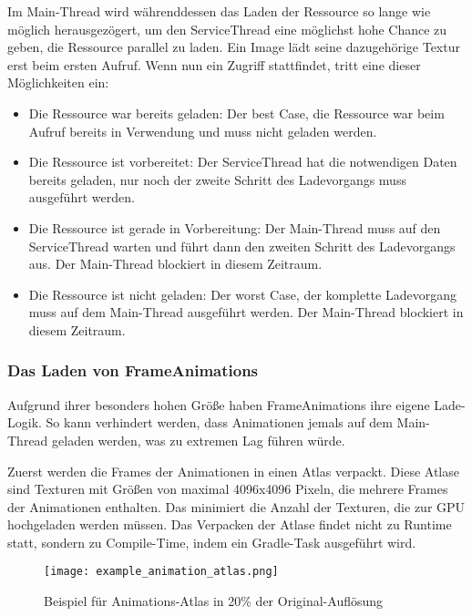 Im Main-Thread wird währenddessen das Laden der Ressource so lange wie möglich herausgezögert, um den ServiceThread
eine möglichst hohe Chance zu geben, die Ressource parallel zu laden.
Ein Image \zB lädt seine dazugehörige Textur erst beim ersten  Aufruf.
Wenn nun ein Zugriff stattfindet, tritt eine dieser Möglichkeiten ein:

\begin{itemize}
    \item Die Ressource war bereits geladen: Der best Case, die Ressource war beim  Aufruf bereits
        in Verwendung und muss nicht geladen werden.
    \item Die Ressource ist vorbereitet: Der ServiceThread hat die notwendigen Daten bereits geladen, nur noch der
        zweite Schritt des Ladevorgangs muss ausgeführt werden.
    \item Die Ressource ist gerade in Vorbereitung: Der Main-Thread muss auf den ServiceThread warten und führt dann
        den zweiten Schritt des Ladevorgangs aus.
        Der Main-Thread blockiert in diesem Zeitraum.
    \item Die Ressource ist nicht geladen: Der worst Case, der komplette Ladevorgang muss auf dem Main-Thread ausgeführt
        werden.
        Der Main-Thread blockiert in diesem Zeitraum.
\end{itemize}

\subsubsection{Das Laden von FrameAnimations}

Aufgrund ihrer besonders hohen Größe haben FrameAnimations ihre eigene Lade-Logik.
So kann verhindert werden, dass Animationen jemals auf dem Main-Thread geladen werden, was zu extremen Lag führen würde.

Zuerst werden die Frames der Animationen in einen Atlas verpackt.
Diese Atlase sind Texturen mit Größen von maximal 4096x4096 Pixeln, die mehrere Frames der Animationen enthalten.
Das minimiert die Anzahl der Texturen, die zur GPU hochgeladen werden müssen.
Das Verpacken der Atlase findet nicht zu Runtime statt, sondern zu Compile-Time, indem ein Gradle-Task ausgeführt wird.

\begin{figure}[H]
    \centering
    \texttt{[image: example\_animation\_atlas.png]}
    \caption{Beispiel für Animations-Atlas in 20\% der Original-Auflösung}
\end{figure}


